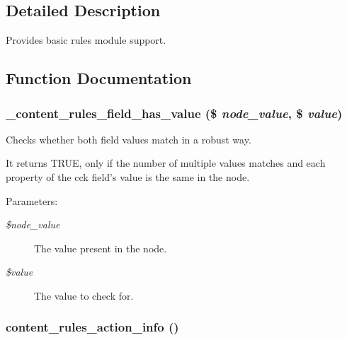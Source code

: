 \subsection{Detailed Description}
Provides basic rules module support. 

\subsection{Function Documentation}
\hypertarget{content_8rules_8inc_1ba49a82564e33db3f3538ceaf7c1f69}{
\subsubsection[{\_\-content\_\-rules\_\-field\_\-has\_\-value}]{\setlength{\rightskip}{0pt plus 5cm}\_\-content\_\-rules\_\-field\_\-has\_\-value (\$ {\em node\_\-value}, \/  \$ {\em value})}}
\label{content_8rules_8inc_1ba49a82564e33db3f3538ceaf7c1f69}


Checks whether both field values match in a robust way.

It returns TRUE, only if the number of multiple values matches and each property of the cck field's value is the same in the node.

\begin{Desc}
\item[Parameters:]
\begin{description}
\item[{\em \$node\_\-value}]The value present in the node. \item[{\em \$value}]The value to check for. \end{description}
\end{Desc}
\hypertarget{content_8rules_8inc_582a8b04d0ab9eaa87145cfc537a711a}{
\subsubsection[{content\_\-rules\_\-action\_\-info}]{\setlength{\rightskip}{0pt plus 5cm}content\_\-rules\_\-action\_\-info ()}}
\label{content_8rules_8inc_582a8b04d0ab9eaa87145cfc537a711a}


